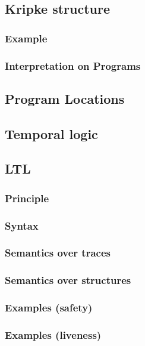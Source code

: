 \documentclass[12pt, a4paper]{book}
\begin{document}
  \subsection{Kripke structure}
  \label{sub:Kripke structure}
  \subsubsection{Example}
  \label{subs:Example}
  \subsubsection{Interpretation on Programs}
  \label{subs:Interpretation on Programs}
  \subsection{Program Locations}
  \label{sub:Program Locations}
  \subsection{Temporal logic}
  \label{sub:Temporal logic}
  \subsection{LTL}
  \label{sub:LTL}
  \subsubsection{Principle}
  \label{subs:Principle}
  \subsubsection{Syntax}
  \label{subs:Syntax}
  \subsubsection{Semantics over traces}
  \label{subs:Semantics over traces}
  \subsubsection{Semantics over structures}
  \label{subs:Semantics over structures}
  \subsubsection{Examples (safety)}
  \label{subs:Examples (safety)}
  \subsubsection{Examples (liveness)}
  \label{subs:Examples (liveness)}
\end{document}

